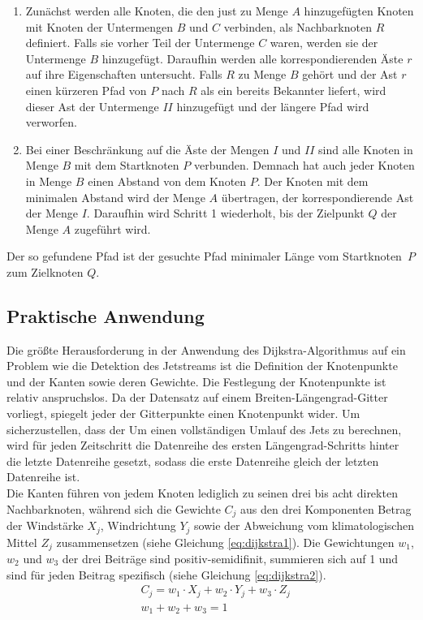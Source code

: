 \begin{enumerate}
  \item Zunächst werden alle Knoten, die den just zu Menge $A$ hinzugefügten Knoten mit Knoten der Untermengen $B$ und $C$ verbinden, als Nachbarknoten $R$ definiert. Falls sie vorher Teil der Untermenge $C$ waren, werden sie der Untermenge $B$ hinzugefügt. Daraufhin werden alle korrespondierenden Äste $r$ auf ihre Eigenschaften untersucht. Falls $R$ zu Menge $B$ gehört und der Ast $r$ einen kürzeren Pfad von $P$ nach $R$ als ein bereits Bekannter liefert, wird dieser Ast der Untermenge $II$ hinzugefügt und der längere Pfad wird verworfen. 
  \item Bei einer Beschränkung auf die Äste der Mengen $I$ und $II$ sind alle Knoten in Menge $B$ mit dem Startknoten $P$ verbunden. Demnach hat auch jeder Knoten in Menge $B$ einen Abstand von dem Knoten $P$. Der Knoten mit dem minimalen Abstand wird der Menge $A$ übertragen, der korrespondierende Ast der Menge $I$. Daraufhin wird Schritt 1 wiederholt, bis der Zielpunkt $Q$ der Menge $A$ zugeführt wird. 
\end{enumerate}
Der so gefundene Pfad ist der gesuchte Pfad minimaler Länge vom Startknoten~$P$ zum Zielknoten $Q$. \citep{dijkstra-1959}
\subsection{Praktische Anwendung}
Die größte Herausforderung in der Anwendung des Dijkstra-Algorithmus auf ein Problem wie die Detektion des Jetstreams ist die Definition der Knotenpunkte und der Kanten sowie deren Gewichte. Die Festlegung der Knotenpunkte ist relativ anspruchslos. Da der Datensatz auf einem Breiten-Längengrad-Gitter vorliegt, spiegelt jeder der Gitterpunkte einen Knotenpunkt wider. Um sicherzustellen, dass der 
Um einen vollständigen Umlauf des Jets zu berechnen, wird für jeden Zeitschritt die Datenreihe des ersten Längengrad-Schritts hinter die letzte Datenreihe gesetzt, sodass die erste Datenreihe gleich der letzten Datenreihe ist.
\\
Die Kanten führen von jedem Knoten lediglich zu seinen drei bis acht direkten Nachbarknoten, während sich die Gewichte $C_j$ aus den drei Komponenten Betrag der Windstärke $X_j$, Windrichtung $Y_j$ sowie der Abweichung vom klimatologischen Mittel $Z_j$ zusammensetzen (siehe Gleichung \ref{eq:dijkstra1}). Die Gewichtungen $w_1$, $w_2$ und $w_3$ der drei Beiträge sind positiv-semidifinit, summieren sich auf 1 und sind für jeden Beitrag spezifisch (siehe Gleichung \ref{eq:dijkstra2}).
\begin{align}
  & C_j = w_1 \cdot X_j + w_2 \cdot Y_j + w_3 \cdot Z_j   
  \label{eq:dijkstra1}\\
  & w_1 + w_2 + w_3 = 1
  \label{eq:dijkstra2}
\end{align} 

